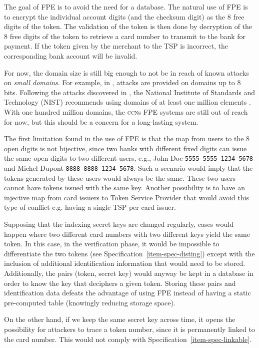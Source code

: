 \documentclass{llncs}
\begin{document}
The goal of FPE is to avoid the need for a database. The natural use of FPE is to encrypt the individual account digits (and the checksum digit) as the 8 free digits of the token. The validation of the token is then done by decryption of the 8 free digits of the token to retrieve a card number to transmit to the bank for payment. If the token given by the merchant to the TSP is incorrect, the corresponding bank account will be invalid.

For now, the domain size is still big enough to not be in reach of known attacks on \textit{small domains}. For example, in \cite{attacksFPEsmallDomains}, attacks are provided on domains up to 8 bits. Following the attacks discovered in \cite{FPEattacks}, the National Institute of Standards and Technology (NIST) recommends using domains of at least one million elements \cite{NistFPErecommandations}. With one hundred million domains, the \textsc{ccn}s  FPE systems are still out of reach for now, but this should be a concern for a long-lasting system.

The first limitation found in the use of FPE is that the map from users to the 8 open digits is not bijective, since two banks with different fixed digits can issue the same open digits to two different users, e.g., John Doe \texttt{5555 5555 1234 5678} and Michel Dupont \texttt{8888 8888 1234 5678}. Such a scenario would imply that the tokens generated by these users would always be the same. These two users cannot have tokens issued with the same key. Another possibility is to have an injective map from card issuers to Token Service Provider that would avoid this type of conflict e.g. having a single TSP per card issuer.

Supposing that the indexing secret keys are changed regularly, cases would happen where two different card numbers with two different keys yield the same token. In this case, in the verification phase, it would be impossible to differentiate the two tokens (see Specification~\ref{item-spec-disting}) except with the inclusion of additional identification information that would need to be stored. Additionally, the pairs (token, secret key) would anyway be kept in a database in order to know the key that deciphers a given token. Storing these pairs and identification data defeats the advantage of using FPE instead of having a static pre-computed table (knowingly reducing storage space).

On the other hand, if we keep the same secret key across time, it opens the possibility for attackers to trace a token number, since it is permanently linked to the card number. This would not comply with Specification~\ref{item-spec-linkable}.
\end{document}
